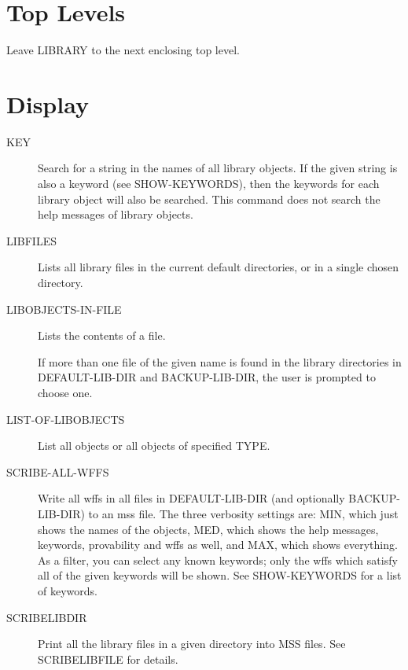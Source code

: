 \section{Top Levels}

\begin{description} 
\item[LEAVE]  
Leave LIBRARY to the next enclosing top level.
\item
\end{description}

\section{Display}

\begin{description} 
\item[KEY]  
Search for a string in the names of all library objects. If
the given string is also a keyword (see SHOW-KEYWORDS), then the keywords
for each library object will also be searched. This command does not search
the help messages of library objects.

\item[LIBFILES]  
Lists all library files in the current default directories,
or in a single chosen directory.

\item[LIBOBJECTS-IN-FILE]  
Lists the contents of a file.

If more than one file of the given name is found in the library directories
in DEFAULT-LIB-DIR and BACKUP-LIB-DIR, the user is prompted to choose one.

\item[LIST-OF-LIBOBJECTS]  
List all objects or all objects of specified TYPE.

\item[SCRIBE-ALL-WFFS]  
Write all wffs in all files in DEFAULT-LIB-DIR (and optionally BACKUP-LIB-DIR)
to an mss file.
The three verbosity settings are: MIN, which just shows the names of the 
objects, MED, which shows the help messages, keywords, provability and wffs 
as well, and MAX, which shows everything. 
As a filter, you can select any known keywords; only the wffs which 
satisfy all of the given keywords will be shown. See SHOW-KEYWORDS 
for a list of keywords.

\item[SCRIBELIBDIR]  
Print all the library files in a given directory into 
MSS files. See SCRIBELIBFILE for details.


\end{description}
